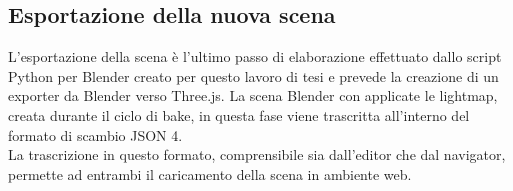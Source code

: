 \subsection{Esportazione della nuova scena}
\label{sec:chapter_baking_service_pipeline_baking_esport_scena}
L’esportazione della scena è l’ultimo passo di elaborazione effettuato dallo script Python per Blender creato per questo lavoro di tesi e prevede la creazione di un exporter da Blender verso Three.js. 
La scena Blender con applicate le lightmap, creata durante il ciclo di bake, in questa fase viene trascritta all’interno del formato di scambio JSON 4. 
\\
La trascrizione in questo formato, comprensibile sia dall’editor che dal navigator, permette ad entrambi il caricamento della scena in ambiente web.
